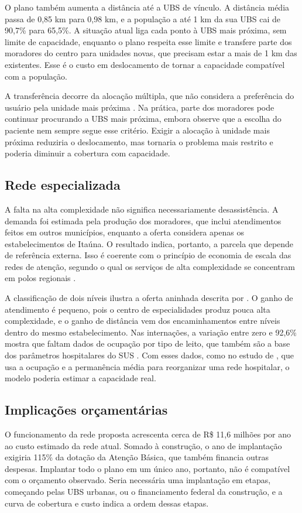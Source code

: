 \documentclass[12pt,a4paper,oneside]{report}
\begin{document}
O plano também aumenta a distância até a UBS de vínculo. A distância média passa de 0,85 km para 0,98 km,
e a população a até 1 km da sua UBS cai de 90,7\% para 65,5\%. A situação atual liga cada ponto à UBS
mais próxima, sem limite de capacidade, enquanto o plano respeita esse limite e transfere parte dos
moradores do centro para unidades novas, que precisam estar a mais de 1 km das existentes. Esse é o custo
em deslocamento de tornar a capacidade compatível com a população.

A transferência decorre da alocação múltipla, que não considera a preferência do usuário pela unidade
mais próxima \citep{contreras2019}. Na prática, parte dos moradores pode continuar procurando a UBS mais
próxima, embora \citet{hodgson1988} observe que a escolha do paciente nem sempre segue esse critério.
Exigir a alocação à unidade mais próxima reduziria o deslocamento, mas tornaria o problema mais restrito e
poderia diminuir a cobertura com capacidade.

\subsection{Rede especializada}
A falta na alta complexidade não significa necessariamente desassistência. A demanda foi estimada pela
produção dos moradores, que inclui atendimentos feitos em outros municípios, enquanto a oferta considera
apenas os estabelecimentos de Itaúna. O resultado indica, portanto, a parcela que depende de referência
externa. Isso é coerente com o princípio de economia de escala das redes de atenção, segundo o qual os
serviços de alta complexidade se concentram em polos regionais \citep{brasil2010,mendes2010}.

A classificação de dois níveis ilustra a oferta aninhada descrita por \citet{sahin2007}. O ganho de
atendimento é pequeno, pois o centro de especialidades produz pouca alta complexidade, e o ganho de
distância vem dos encaminhamentos entre níveis dentro do mesmo estabelecimento. Nas internações, a
variação entre zero e 92,6\% mostra que faltam dados de ocupação por tipo de leito, que também são a
base dos parâmetros hospitalares do SUS \citep{brasil2015b}. Com esses dados, como
no estudo de \citet{guerriero2016}, que usa a ocupação e a permanência média para reorganizar uma rede
hospitalar, o modelo poderia estimar a capacidade real.

\subsection{Implicações orçamentárias}
O funcionamento da rede proposta acrescenta cerca de R\$ 11,6 milhões por ano ao custo estimado da rede
atual. Somado à construção, o ano de implantação exigiria 115\% da dotação da Atenção Básica, que também
financia outras despesas. Implantar todo o plano em um único ano, portanto, não é compatível com o
orçamento observado. Seria necessária uma implantação em etapas, começando pelas UBS urbanas, ou o
financiamento federal da construção, e a curva de cobertura e custo indica a ordem dessas etapas.
\end{document}

